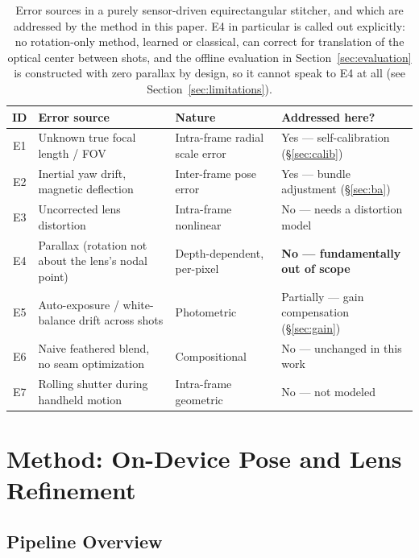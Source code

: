 \documentclass[11pt]{article}
\begin{document}
\begin{table}[h]
\centering
\small
\begin{tabularx}{\textwidth}{@{}cX>{\raggedright\arraybackslash}p{}>{\raggedright\arraybackslash}p{}@{}}
\toprule
\textbf{ID} & \textbf{Error source} & \textbf{Nature} & \textbf{Addressed here?} \\
\midrule
E1 & Unknown true focal length / FOV & Intra-frame radial scale error & Yes --- self-calibration (\S\ref{sec:calib}) \\
E2 & Inertial yaw drift, magnetic deflection & Inter-frame pose error & Yes --- bundle adjustment (\S\ref{sec:ba}) \\
E3 & Uncorrected lens distortion & Intra-frame nonlinear & No --- needs a distortion model \\
E4 & Parallax (rotation not about the lens's nodal point) & Depth-dependent, per-pixel & \textbf{No --- fundamentally out of scope} \\
E5 & Auto-exposure / white-balance drift across shots & Photometric & Partially --- gain compensation (\S\ref{sec:gain}) \\
E6 & Naive feathered blend, no seam optimization & Compositional & No --- unchanged in this work \\
E7 & Rolling shutter during handheld motion & Intra-frame geometric & No --- not modeled \\
\bottomrule
\end{tabularx}
\caption{Error sources in a purely sensor-driven equirectangular stitcher, and which are addressed by the method in this paper. E4 in particular is called out explicitly: no rotation-only method, learned or classical, can correct for translation of the optical center between shots, and the offline evaluation in Section~\ref{sec:evaluation} is constructed with zero parallax by design, so it cannot speak to E4 at all (see Section~\ref{sec:limitations}).}
\label{tab:errortax}
\end{table}

\section{Method: On-Device Pose and Lens Refinement}
\label{sec:method}

\subsection{Pipeline Overview}
\label{sec:overview}
\end{document}
